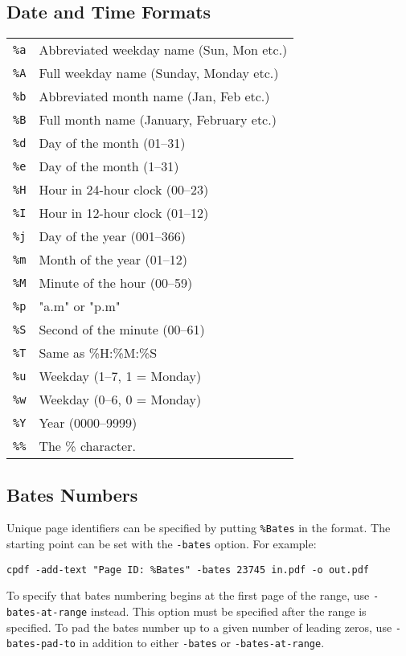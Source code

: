 \documentclass{book}
\begin{document}
  \subsection{Date and Time Formats}
  \begin{tabular}{ll}
    \texttt{\%a} & Abbreviated weekday name (Sun, Mon etc.)\\
    \texttt{\%A} & Full weekday name (Sunday, Monday etc.)\\
    \texttt{\%b} & Abbreviated month name (Jan, Feb etc.)\\
    \texttt{\%B} & Full month name (January, February etc.)\\
    \texttt{\%d} & Day of the month (01--31) \\
    \texttt{\%e} & Day of the month (1--31) \\
    \texttt{\%H} & Hour in 24-hour clock (00--23)\\
    \texttt{\%I} & Hour in 12-hour clock (01--12)\\
    \texttt{\%j} & Day of the year (001--366)\\
    \texttt{\%m} & Month of the year (01--12)\\
    \texttt{\%M} & Minute of the hour (00--59)\\
    \texttt{\%p} & "a.m" or "p.m"\\
    \texttt{\%S} & Second of the minute (00--61)\\
    \texttt{\%T} & Same as \%H:\%M:\%S\\
    \texttt{\%u} & Weekday (1--7, 1 = Monday)\\
    \texttt{\%w} & Weekday (0--6, 0 = Monday)\\
    \texttt{\%Y} & Year (0000--9999)\\
    \texttt{\%\%} & The \% character.
  \end{tabular}

  \subsection{Bates Numbers}
  Unique page identifiers can be specified by putting \verb!%Bates! in the format.
The starting point can be set with the \texttt{-bates} option. For example:
  \begin{framed}
    \small\verb!cpdf -add-text "Page ID: %Bates" -bates 23745 in.pdf -o out.pdf!
  \end{framed}

To specify that bates numbering begins at the first page of the range, use \texttt{-bates-at-range} instead. This option must be specified after the range is specified. To pad the bates number up to a given number of leading zeros, use \texttt{-bates-pad-to} in addition to either \texttt{-bates} or \texttt{-bates-at-range}.
\end{document}
